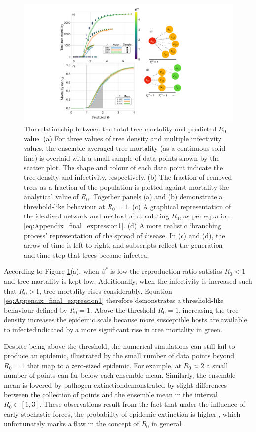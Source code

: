\begin{figure}
    \centering
    \includegraphics[scale=0.44]{chapter5/figures/fig4-R0-analytic-vs-mortality.pdf}
    \caption{The relationship between the total tree mortality and predicted $R_0$ value. (a) For three values of tree density and multiple infectivity values, the ensemble-averaged tree mortality (as a continuous solid line) is overlaid with a small sample of data points shown by the scatter plot. The shape and colour of each data point indicate the tree density and infectivity, respectively. (b) The fraction of removed trees as a fraction of the population is plotted against mortality the analytical value of $R_0$. Together panels (a) and (b) demonstrate a threshold-like behaviour at $R_0=1$. (c) A graphical representation of the idealised network and method of calculating $R_0$, as per equation \ref{eq:Appendix_final_expression1}. (d) A more realistic `branching process' representation of the spread of disease. In (c) and (d), the arrow of time is left to right, and subscripts reflect the generation and time-step that trees become infected.}
    \label{fig:R0-vs-NLM-sims}
\end{figure}

According to Figure \ref{fig:R0-vs-NLM-sims}(a), when $\beta^*$ is low the reproduction ratio satisfies $R_0<1$ and tree mortality is kept low.
Additionally, when the infectivity is increased such that $R_0>1$,  tree mortality rises considerably.
Equation \ref{eq:Appendix_final_expression1} therefore demonstrates a threshold-like behaviour defined by $R_0=1$.
Above the threshold $R_0=1$, increasing the tree density increases the epidemic scale because more susceptible hosts are available to infected\textemdash indicated by a more significant rise in tree mortality in green.

Despite being above the threshold, the numerical simulations can still fail to produce an epidemic,
illustrated by the small number of data points beyond $R_0=1$ that map to a zero-sized epidemic. For example, at $R_0\approx 2$ a small number of points can far below each ensemble mean.
Similarly, the ensemble mean is lowered by pathogen extinction\textemdash demonstrated by slight differences between the collection of points and the ensemble mean in the interval $R_0 \in [1, 3]$.
These observations result from the fact that under the influence of early stochastic forces, the probability of epidemic extinction is higher \cite{perspectives-on-r0, R0-perc-ref}, which unfortunately marks a flaw in the concept of $R_0$ in general \cite{li2011failure}.

